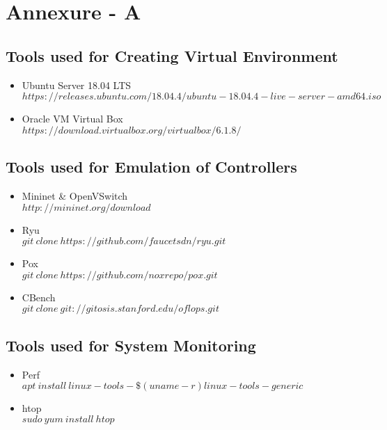 \chapter*{Annexure - A}

\section*{Tools used for Creating Virtual Environment}

\begin{itemize}

    \item Ubuntu Server 18.04 LTS \\
    $https://releases.ubuntu.com/18.04.4/ubuntu-18.04.4-live-server-amd64.iso$
    \item Oracle VM Virtual Box \\
    $https://download.virtualbox.org/virtualbox/6.1.8/$
    
\end{itemize}

\section*{Tools used for Emulation of Controllers}

\begin{itemize}

    \item Mininet \& OpenVSwitch \\
    $http://mininet.org/download$
    \item Ryu \\
    $git\ clone\ https://github.com/faucetsdn/ryu.git$
    \item Pox \\
    $git\ clone\ https://github.com/noxrepo/pox.git$
    \item CBench \\ 
    $git\ clone\ git://gitosis.stanford.edu/oflops.git$
    
\end{itemize}

\section*{Tools used for System Monitoring}

\begin{itemize}

    \item Perf \\
    $apt\ install\ linux-tools-\$(uname -r) linux-tools-generic$
    \item htop \\
    $sudo\ yum\ install\ htop$
    
\end{itemize}